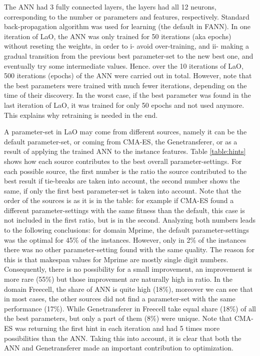 \documentclass{MYsig-alternate}
\begin{document}
The ANN had 3 fully connected layers, the layers had all 12 neurons, corresponding to the number or parameters and features, respectively. Standard back-propagation algorithm was used for learning (the default in FANN). In one iteration of LaO, the ANN was only trained for 50 iterations (aka epochs) without reseting the weights, in order to i- avoid over-training, and ii- making a gradual transition from the previous best parameter-set to the new best one, and eventually try some intermediate values. Hence. over the 10 iterations of LaO, 500 iterations (epochs) of the ANN were carried out in total. However, note that the best parameters were trained with much fewer iterations, depending on the time of their discovery. In the worst case, if the best parameter was found in the last iteration of LaO, it was trained for only 50 epochs and not used anymore. This explains why retraining is needed in the end.

A parameter-set in LaO may come from different sources, namely it can be the default parameter-set, or coming from CMA-ES, the Genetransferer, or as a result of applying the trained ANN to the instance features. Table \ref{table:hints} shows how each source contributes to the best overall parameter-settings. For each possible source, the first number is the ratio the source contributed to the best result if tie-breaks are taken into account, the second number shows the same, if only the first best parameter-set is taken into account. Note that the order of the sources is as it is in the table: for example if CMA-ES found a different parameter-settings with the same fitness than the default, this case is not included in the first ratio, but is in the second. Analyzing both numbers leads to the following conclusions: for domain Mprime, the default parameter-settings was the optimal for 45\% of the instances. However, only in 2\% of the instances there was no other parameter-setting found with the same quality. The reason for this is that makespan values for Mprime are mostly single digit numbers. Consequently, there is no possibility for a small improvement, an improvement is more rare (55\%) but those improvement are naturally high in ratio. In the domain Freecell, the share of ANN is quite high (18\%), moreover we can see that in most cases, the other sources did not find a parameter-set with the same performance (17\%). While Genetransferer in Freecell take equal share (18\%) of all the best parameters, but only a part of them (8\%) were unique. Note that CMA-ES was returning the first hint in each iteration and had 5 times more possibilities than the ANN. Taking this into account, it is clear that both the ANN and Genetransferer made an important contribution to optimization.
\end{document}
